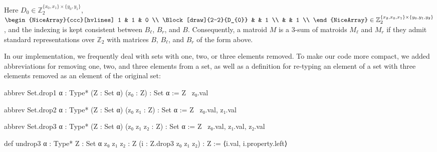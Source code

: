 Here $D_{0} \in \mathbb{Z}_{2}^{\{x_{0}, x_{1}\} \times \{y_{0}, y_{1}\}}$,
$
    \begin{NiceArray}{ccc}[hvlines]
        1 & 1 & 0 \\
        \Block[draw]{2-2}{D_{0}} & & 1 \\
        & & 1 \\
    \end{NiceArray} \in \mathbb{Z}_{2}^{\{x_{2}, x_{0}, x_{1}\} \times \{y_{0}, y_{1}, y_{2}\}}
$,
and the indexing is kept consistent between $B_{\ell}$, $B_{r}$, and $B$.
Consequently, a matroid $M$ is a 3-sum of matroids $M_{\ell}$ and $M_{r}$ if they admit standard representations over $\mathbb{Z}_{2}$ with matrices $B$, $B_{\ell}$, and $B_{r}$ of the form above.

In our implementation, we frequently deal with sets with one, two, or three elements removed. To make our code more compact, we added abbreviations for removing one, two, and three elements from a set, as well as a definition for re-typing an element of a set with three elements removed as an element of the original set:
\begin{leancode}
abbrev Set.drop1 {α : Type*} (Z : Set α)
    (z₀ : Z) : Set α :=
  Z \ {z₀.val}
\end{leancode}
\begin{leancode}
abbrev Set.drop2 {α : Type*} (Z : Set α)
    (z₀ z₁ : Z) : Set α :=
  Z \ {z₀.val, z₁.val}
\end{leancode}
\begin{leancode}
abbrev Set.drop3 {α : Type*} (Z : Set α)
    (z₀ z₁ z₂ : Z) : Set α :=
  Z \ {z₀.val, z₁.val, z₂.val}
\end{leancode}
\begin{leancode}
def undrop3 {α : Type*} {Z : Set α}
    {z₀ z₁ z₂ : Z} (i : Z.drop3 z₀ z₁ z₂) : Z :=
  ⟨i.val, i.property.left⟩
\end{leancode}

